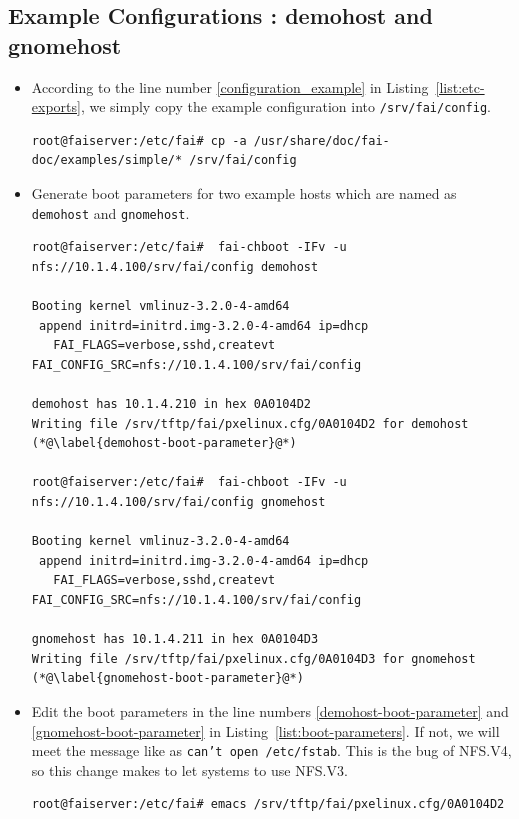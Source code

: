 \documentclass[11pt
  , a4paper
  , article
  , oneside
]{memoir}
\begin{document}
\subsection{Example Configurations : demohost and gnomehost}
\begin{itemize}
\item According to the line number \ref{configuration_example} in Listing~\ref{list:etc-exports}, we simply copy the example configuration into \texttt{/srv/fai/config}.
\begin{lstlisting}
root@faiserver:/etc/fai# cp -a /usr/share/doc/fai-doc/examples/simple/* /srv/fai/config
\end{lstlisting}

\item Generate boot parameters for two example hosts which are named as \texttt{demohost} and \texttt{gnomehost}.

\begin{lstlisting}[style=termstylenumber, caption={Generate Boot Parameters for \texttt{demohost} and \texttt{gnomehost}}, label={list:boot-parameters}]
root@faiserver:/etc/fai#  fai-chboot -IFv -u nfs://10.1.4.100/srv/fai/config demohost

Booting kernel vmlinuz-3.2.0-4-amd64
 append initrd=initrd.img-3.2.0-4-amd64 ip=dhcp  
   FAI_FLAGS=verbose,sshd,createvt FAI_CONFIG_SRC=nfs://10.1.4.100/srv/fai/config

demohost has 10.1.4.210 in hex 0A0104D2
Writing file /srv/tftp/fai/pxelinux.cfg/0A0104D2 for demohost (*@\label{demohost-boot-parameter}@*) 

root@faiserver:/etc/fai#  fai-chboot -IFv -u nfs://10.1.4.100/srv/fai/config gnomehost

Booting kernel vmlinuz-3.2.0-4-amd64
 append initrd=initrd.img-3.2.0-4-amd64 ip=dhcp  
   FAI_FLAGS=verbose,sshd,createvt FAI_CONFIG_SRC=nfs://10.1.4.100/srv/fai/config

gnomehost has 10.1.4.211 in hex 0A0104D3
Writing file /srv/tftp/fai/pxelinux.cfg/0A0104D3 for gnomehost (*@\label{gnomehost-boot-parameter}@*) 
\end{lstlisting}

\item Edit the boot parameters in the line numbers \ref{demohost-boot-parameter} and \ref{gnomehost-boot-parameter} in Listing~\ref{list:boot-parameters}. If not, we will meet the message like as \texttt{can't open /etc/fstab}. This is the bug of NFS.V4, so this change makes to let systems to use NFS.V3. 
\begin{lstlisting}[emph={nfsroot}, emphstyle=\underbar, style=termstylenumber, caption={Default Boot Parameters}, label={list:default-boot-parameter}]
root@faiserver:/etc/fai# emacs /srv/tftp/fai/pxelinux.cfg/0A0104D2


\end{lstlisting}
\end{itemize}
\end{document}

